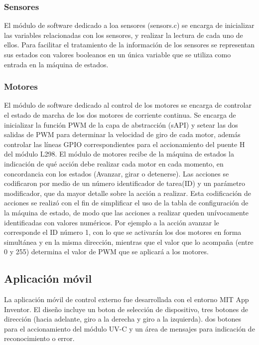 		
		\subsubsection{Sensores}

El módulo de software dedicado a loa sensores (sensors.c) se encarga de inicializar las variables relacionadas con los sensores, y realizar la lectura de cada uno de ellos. Para facilitar el tratamiento de la información de los sensores se representan sus estados con valores booleanos en un única variable que se utiliza como entrada en la máquina de estados. 
	
		
		\subsubsection{Motores}

El módulo de software dedicado al control de los motores se encarga de controlar el estado de marcha de los dos motores de corriente continua. 
Se encarga de inicializar la función PWM de la capa de abstracción (sAPI) y setear las dos salidas de PWM  para determinar la velocidad de giro de cada motor, además controlar las líneas GPIO correspondientes para el accionamiento del puente H del módulo L298.
El módulo de motores recibe de la máquina de estados la indicación de qué acción debe realizar cada motor en cada momento, en concordancia con los estados (Avanzar, girar o detenerse). Las acciones se codificaron por medio de un número identificador de tarea(ID) y un parámetro modificador, que da mayor detalle sobre la acción a realizar.
Esta codificación de acciones se realizó con el fin de simplificar el uso de la tabla de configuración de la máquina de estado, de modo que las acciones a realizar queden unívocamente identificadas con valores numéricos.
Por ejemplo a la acción avanzar le corresponde el ID número 1, con lo que se activarán los dos motores en forma simultánea y en la misma dirección,  mientras que el valor que lo acompaña (entre 0 y 255) determina el valor de PWM que se aplicará a los motores.



\subsection{Aplicación móvil}

La aplicación móvil de control externo fue desarrollada con el entorno MIT App Inventor. 
El diseño incluye un boton de selección de dispositivo, tres botones de dirección (hacia adelante, giro a la derecha y giro a la izquierda). dos botones para el accionamiento del módulo UV-C y un área de mensajes para indicación de reconocimiento o error. 

